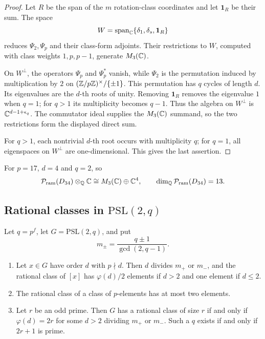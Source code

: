 \begin{proof}
Let \(R\) be the span of the \(m\) rotation-class coordinates and let
\(\mathbf1_R\) be their sum.  The space
\[
 W=\operatorname{span}_\mathbb C\{\delta_1,\delta_s,\mathbf1_R\}
\]
reduces \(\Psi_2,\Psi_p\) and their class-form adjoints.  Their restrictions
to \(W\), computed with class weights \(1,p,p-1\), generate \(M_3(\mathbb C)\).

On \(W^\perp\), the operators \(\Psi_p\) and \(\Psi_p^*\) vanish, while
\(\Psi_2\) is the permutation induced by multiplication by \(2\) on
\((\mathbb Z/p\mathbb Z)^\times/\{\pm1\}\).  This permutation has \(q\) cycles of length
\(d\).  Its eigenvalues are the \(d\)-th roots of unity.  Removing
\(\mathbf1_R\) removes the eigenvalue \(1\) when \(q=1\); for \(q>1\) its
multiplicity becomes \(q-1\).  Thus the algebra on \(W^\perp\) is
\(\mathbb C^{d-1+\epsilon_q}\).  The commutator ideal supplies the \(M_3(\mathbb C)\)
summand, so the two restrictions form the displayed direct sum.

For \(q>1\), each nontrivial \(d\)-th root occurs with multiplicity \(q\);
for \(q=1\), all eigenspaces on \(W^\perp\) are one-dimensional.  This gives
the last assertion.
\end{proof}

For \(p=17\), \(d=4\) and \(q=2\), so
\[
 \mathcal P_{\mathrm{ram}}(D_{34})\otimes_\mathbb Q\mathbb C\cong M_3(\mathbb C)\oplus\mathbb C^4,
 \qquad \dim_\mathbb Q\mathcal P_{\mathrm{ram}}(D_{34})=13.
\]

\subsection{Rational classes in \texorpdfstring{\(\mathrm{PSL}(2,q)\)}{PSL(2,q)}}

\begin{theorem}
\label{thm:psl2-rational-classes}
Let \(q=p^f\), let \(G=\mathrm{PSL}(2,q)\), and put
\[
 m_\pm=\frac{q\pm1}{\gcd(2,q-1)} .
\]
\begin{enumerate}
\item Let \(x\in G\) have order \(d\) with \(p\nmid d\).  Then \(d\) divides
\(m_+\) or \(m_-\), and the rational class of \([x]\) has \(\varphi(d)/2\)
elements if \(d>2\) and one element if \(d\leq2\).
\item The rational class of a class of \(p\)-elements has at most two
elements.
\item Let \(r\) be an odd prime.  Then \(G\) has a rational class of size
\(r\) if and only if \(\varphi(d)=2r\) for some \(d>2\) dividing \(m_+\) or
\(m_-\).  Such a \(q\) exists if and only if \(2r+1\) is prime.
\end{enumerate}
\end{theorem}

